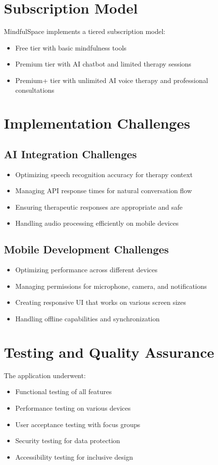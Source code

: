 \documentclass[11pt,a4paper]{article}
\begin{document}
\section{Subscription Model}
MindfulSpace implements a tiered subscription model:
\begin{itemize}
    \item Free tier with basic mindfulness tools
    \item Premium tier with AI chatbot and limited therapy sessions
    \item Premium+ tier with unlimited AI voice therapy and professional consultations
\end{itemize}

\section{Implementation Challenges}

\subsection{AI Integration Challenges}
\begin{itemize}
    \item Optimizing speech recognition accuracy for therapy context
    \item Managing API response times for natural conversation flow
    \item Ensuring therapeutic responses are appropriate and safe
    \item Handling audio processing efficiently on mobile devices
\end{itemize}

\subsection{Mobile Development Challenges}
\begin{itemize}
    \item Optimizing performance across different devices
    \item Managing permissions for microphone, camera, and notifications
    \item Creating responsive UI that works on various screen sizes
    \item Handling offline capabilities and synchronization
\end{itemize}

\section{Testing and Quality Assurance}
The application underwent:
\begin{itemize}
    \item Functional testing of all features
    \item Performance testing on various devices
    \item User acceptance testing with focus groups
    \item Security testing for data protection
    \item Accessibility testing for inclusive design
\end{itemize}
\end{document}
